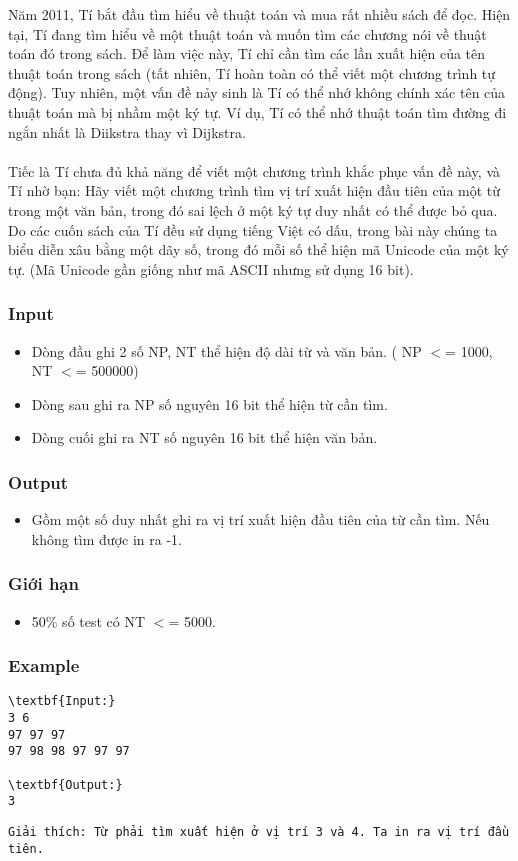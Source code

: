 

Năm 2011, Tí bắt đầu tìm hiểu về thuật toán và mua rất nhiều sách để đọc. Hiện tại, Tí đang tìm hiểu về một thuật toán và muốn tìm các chương nói về thuật toán đó trong sách. Để làm việc này, Tí chỉ cần tìm các lần xuất hiện của tên thuật toán trong sách (tất nhiên, Tí hoàn toàn có thể viết một chương trình tự động). Tuy nhiên, một vấn đề nảy sinh là Tí có thể nhớ không chính xác tên của thuật toán mà bị nhầm một ký tự. Ví dụ, Tí có thể nhớ thuật toán tìm đường đi ngắn nhất là Diikstra thay vì Dijkstra.
\\
\\Tiếc là Tí chưa đủ khả năng để viết một chương trình khắc phục vấn đề này, và Tí nhờ bạn: Hãy viết một chương trình tìm vị trí xuất hiện đầu tiên của một từ trong một văn bản, trong đó sai lệch ở một ký tự duy nhất có thể được bỏ qua. Do các cuốn sách của Tí đều sử dụng tiếng Việt có dấu, trong bài này chúng ta biểu diễn xâu bằng một dãy số, trong đó mỗi số thể hiện mã Unicode của một ký tự. (Mã Unicode gần giống như mã ASCII nhưng sử dụng 16 bit).

\subsubsection{Input}
\begin{itemize}
	\item Dòng đầu ghi 2 số NP, NT thể hiện độ dài từ và văn bản. ( NP $<$= 1000, NT $<$= 500000)
\end{itemize}
\begin{itemize}
	\item Dòng sau ghi ra NP số nguyên 16 bit thể hiện từ cần tìm.
\end{itemize}
\begin{itemize}
	\item Dòng cuối ghi ra NT số nguyên 16 bit thể hiện văn bản.
\end{itemize}

\subsubsection{Output}
\begin{itemize}
	\item Gồm một số duy nhất ghi ra vị trí xuất hiện đầu tiên của từ cần tìm. Nếu không tìm được in ra -1.
\end{itemize}

\subsubsection{Giới hạn}
\begin{itemize}
	\item 50\% số test có NT $<$= 5000.
\end{itemize}

\subsubsection{Example}
\begin{verbatim}
\textbf{Input:}
3 6
97 97 97
97 98 98 97 97 97

\textbf{Output:}
3\end{verbatim}
\begin{verbatim}
Giải thích: Từ phải tìm xuất hiện ở vị trí 3 và 4. Ta in ra vị trí đầu tiên.\end{verbatim}